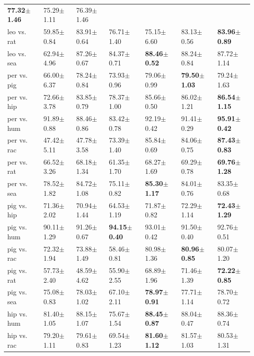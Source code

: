 \documentclass[twoside,zihao=-4,UTF8]{bjfu}
\begin{document}
{\begin{flushleft}
\begin{longtable}[h]{p{55pt}p{50pt}p{50pt}p{50pt}p{50pt}p{50pt}p{50pt}}
		\textbf{77.32$\pm$1.46} & 75.29$\pm$1.11 & 76.39$\pm$1.46 \\
		leo vs. rat & 59.85$\pm$0.84 & 83.91$\pm$0.64 & 76.71$\pm$1.40 & 
		75.15$\pm$6.60 & 83.13$\pm$0.56 & \textbf{83.96$\pm$0.89} \\
		leo vs. sea & 62.94$\pm$4.96 & 87.26$\pm$0.67 & 84.37$\pm$0.71 & 
		\textbf{88.46$\pm$0.52} & 88.24$\pm$0.84 & 87.72$\pm$1.14 \\
		per vs. pig & 66.00$\pm$6.37 & 78.24$\pm$0.84 & 73.93$\pm$0.96 & 
		79.06$\pm$0.99 & \textbf{79.50$\pm$1.03} & 79.24$\pm$1.63 \\
		per vs. hip & 72.66$\pm$3.78 & 83.85$\pm$0.79 & 78.37$\pm$1.00 & 
		85.66$\pm$0.50 & 86.02$\pm$1.21 & \textbf{86.54$\pm$1.15} \\
		per vs. hum & 91.89$\pm$0.88 & 88.46$\pm$0.86 & 83.42$\pm$0.78 & 
		92.19$\pm$0.42 & 91.41$\pm$0.29 & \textbf{95.91$\pm$0.42} \\
		per vs. rac & 47.42$\pm$5.11 & 47.78$\pm$3.58 & 73.39$\pm$1.40 & 
		85.84$\pm$0.69 & 84.06$\pm$0.75 & \textbf{87.43$\pm$0.83} \\
		per vs. rat & 66.52$\pm$3.26 & 68.18$\pm$1.34 & 61.35$\pm$1.70 & 
		68.27$\pm$1.69 & 69.29$\pm$0.78 & \textbf{69.76$\pm$1.28} \\
		per vs. sea & 78.52$\pm$1.82 & 84.72$\pm$1.08 & 75.11$\pm$0.82 & 
		\textbf{85.30$\pm$1.17} & 84.01$\pm$0.76 & 83.35$\pm$0.68 \\
		pig vs. hip & 71.36$\pm$2.02 & 70.94$\pm$1.44 & 64.53$\pm$1.19 & 
		71.87$\pm$0.82 & 72.29$\pm$1.14 & \textbf{72.43$\pm$1.29} \\
		pig vs. hum & 90.11$\pm$1.29 & 91.26$\pm$0.67 & \textbf{94.15$\pm$0.40} 
		& 93.01$\pm$0.42 & 91.50$\pm$0.40 & 92.76$\pm$0.51 \\
		pig vs. rac & 72.32$\pm$1.94 & 73.88$\pm$1.49 & 58.46$\pm$0.81 & 
		80.98$\pm$1.36 & \textbf{80.96$\pm$0.85} & 80.07$\pm$1.20 \\
		pig vs. rat & 57.73$\pm$2.40 & 48.59$\pm$4.62 & 55.90$\pm$2.55 & 
		68.89$\pm$1.96 & 71.46$\pm$1.39 & \textbf{72.22$\pm$0.85} \\
		pig vs. sea & 75.08$\pm$0.83 & 78.03$\pm$1.02 & 67.10$\pm$2.11 & 
		\textbf{78.97$\pm$0.91} & 77.71$\pm$1.14 & 78.70$\pm$0.72 \\
		hip vs. hum & 81.40$\pm$1.05 & 88.15$\pm$1.07 & 75.67$\pm$1.54 & 
		\textbf{88.45$\pm$0.87} & 88.04$\pm$0.47 & 88.36$\pm$0.74 \\
		hip vs. rac & 79.20$\pm$1.11 & 79.61$\pm$0.83 & 69.54$\pm$1.23 & 
		\textbf{81.60$\pm$1.12} & 81.57$\pm$1.03 & 80.53$\pm$1.31 \\

\end{longtable}
\end{flushleft}}
\end{document}
